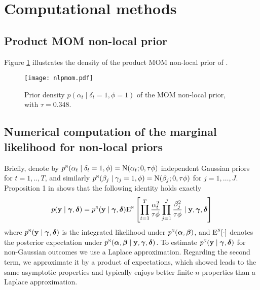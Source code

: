 \documentclass[12pt]{article}
\newcommand{\E}{\mbox{\textup{E}}}
\newcommand{\mb}[1]{\mathbf{#1}}
\newcommand{\by}{{\mb{y}}}
\newcommand{\balpha}{{\bm{\alpha}}}
\newcommand{\bbeta}{{\bm{\beta}}}
\newcommand{\bgamma}{{\bm{\gamma}}}
\newcommand{\bdelta}{{\bm{\delta}}}
\newcommand{\omcom}[1]{ {\color{blue} #1} }
\begin{document}
\section{Computational methods}

\subsection{Product MOM non-local prior}

Figure \ref{fig:nlpmom} illustrates the density of the product MOM non-local prior of \cite{Johnson12}.

\begin{figure}[h]
\centering
\texttt{[image: nlpmom.pdf]} 
\caption{Prior density $p(\alpha_{t} \mid \delta_{t} = 1, \phi = 1)$ of the MOM non-local prior, with $\tau = 0.348$.}
\label{fig:nlpmom}
\end{figure}

\subsection{Numerical computation of the marginal likelihood for non-local priors} \label{subsec:nlp_approx}

Briefly, denote by $p^\textsc{n}(\alpha_t \mid \delta_t=1, \phi) = \text{N}(\alpha_t; 0, \tau \phi)$ independent Gaussian priors for $t=1,..,T$, and similarly $p^\textsc{n}(\beta_j \mid \gamma_j=1, \phi) = \text{N}(\beta_j; 0, \tau \phi)$ for $j=1,\ldots, J$. Proposition 1 in \cite{Rossell17} shows that the following identity holds exactly
\begin{align*}
p(\by \mid \bgamma, \bdelta)= p^\textsc{n}(\by \mid \bgamma, \bdelta) \E^\textsc{n} \left[ \prod_{t=1}^{T} \frac{\alpha_t^2}{\tau\phi} \prod_{j=1}^{J} \frac{\beta_j^2}{\tau\phi} \mid \by, \bgamma, \bdelta \right]
\end{align*}
where $p^\textsc{n}(\by \mid \bgamma, \bdelta)$ is the integrated likelihood under $p^\textsc{n}(\balpha, \bbeta)$, and $\E^\textsc{n}[\cdot]$ denotes the posterior expectation under $p^\textsc{n}(\balpha, \bbeta \mid \by, \bgamma, \bdelta)$.
To estimate $p^\textsc{n}(\by \mid \bgamma, \bdelta)$ for non-Gaussian outcomes we use a Laplace approximation. Regarding the second term, we approximate it by a product of expectations, which \cite{Rossell20a} showed leads to the same asymptotic properties and typically enjoys better finite-$n$ properties than a Laplace approximation.
\end{document}
